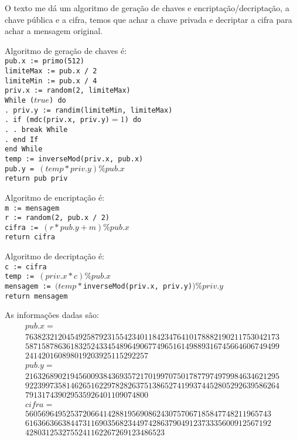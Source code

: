 \documentclass{article}
\begin{document}
O texto me dá um algoritmo de geração de chaves e
encriptação/decriptação, a chave pública e a cifra,
temos que achar a chave privada e
decriptar a cifra para achar a mensagem original.

Algoritmo de geração de chaves é:
\texttt{ \\
    pub.x := primo(512) \\
    limiteMax := pub.x / 2 \\
    limiteMin := pub.x / 4 \\
    priv.x := random(2, limiteMax) \\
    While ($true$) do \\
    . priv.y := randim(limiteMin, limiteMax) \\
    . if (\(\)mdc(priv.x, priv.y)\( = 1\)) do \\
    . . break While \\
    . end If \\
    end While \\
    temp := inverseMod(priv.x, pub.x) \\
    pub.y = \((temp * priv.y) \% pub.x\) \\
    return pub priv
}

Algoritmo de encriptação é:
\texttt{ \\
    m := mensagem \\
    r := random(2, pub.x / 2) \\
    cifra := \((r * pub.y + m) \% pub.x\) \\
    return cifra
}

Algoritmo de decriptação é:
\texttt{ \\
    c := cifra \\
    temp := \((priv.x * c) \% pub.x\) \\
    mensagem := \((temp * \)inverseMod(priv.x, priv.y)\() \% priv.y\) \\
    return mensagem
}

As informações dadas são:
\begin{gather*}
    pub.x = \\
    7638232120454925879231554234011
    8423476410178882190211753042173 \\
    5871587863618325243345489649067
    7496516149889316745664606749499 \\
    241420160898019203925115292257 \\
    pub.y = \\
    2163268902194560093843693572170
    1997075017877974979984634621295 \\
    9223997358146265162297828263751
    3865274199374452805292639586264 \\
    791317439029535926401109074800 \\
    cifra = \\
    560569649525372066414288195690
    862430757067185847748211965743 \\
    616366366384473116903568234497
    428637904912373335600912567192 \\
    428031253275524116226726912348
    6523
\end{gather*}
\end{document}
